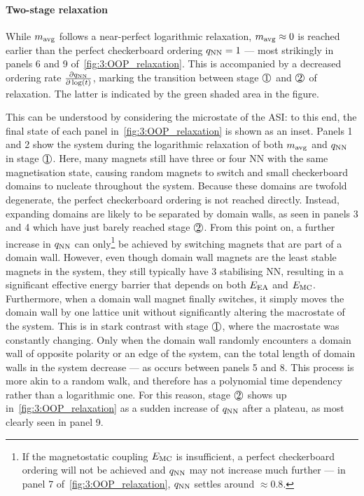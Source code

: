 \paragraph{Two-stage relaxation}
While $m_\mathrm{avg}$ follows a near-perfect logarithmic relaxation, $m_\mathrm{avg} \approx 0$ is reached earlier than the perfect checkerboard ordering $q_\mathrm{NN} = 1$ --- most strikingly in panels 6 and 9 of~\cref{fig:3:OOP_relaxation}.
This is accompanied by a decreased ordering rate $\frac{\partial q_\mathrm{NN}}{\partial \log(t)}$, marking the transition between stage $\circled{1}$ and $\circled{2}$ of relaxation.
The latter is indicated by the green shaded area in the figure. \par
This can be understood by considering the microstate of the ASI: to this end, the final state of each panel in~\cref{fig:3:OOP_relaxation} is shown as an inset.
Panels 1 and 2 show the system during the logarithmic relaxation of both $m_\mathrm{avg}$ and $q_\mathrm{NN}$ in stage $\circled{1}$.
Here, many magnets still have three or four NN with the same magnetisation state, causing random magnets to switch and small checkerboard domains to nucleate throughout the system.
Because these domains are twofold degenerate, the perfect checkerboard ordering is not reached directly.
Instead, expanding domains are likely to be separated by domain walls, as seen in panels 3 and 4 which have just barely reached stage $\circled{2}$.
From this point on, a further increase in $q_\mathrm{NN}$ can only\footnote{
	If the magnetostatic coupling $E_\mathrm{MC}$ is insufficient, a perfect checkerboard ordering will not be achieved and $q_\mathrm{NN}$ may not increase much further --- in panel 7 of~\cref{fig:3:OOP_relaxation}, $q_\mathrm{NN}$ settles around $\approx 0.8$.
} be achieved by switching magnets that are part of a domain wall.
However, even though domain wall magnets are the least stable magnets in the system, they still typically have 3 stabilising NN, resulting in a significant effective energy barrier that depends on both $E_\mathrm{EA}$ and $E_\mathrm{MC}$.
Furthermore, when a domain wall magnet finally switches, it simply moves the domain wall by one lattice unit without significantly altering the macrostate of the system.
This is in stark contrast with stage $\circled{1}$, where the macrostate was constantly changing.
Only when the domain wall randomly encounters a domain wall of opposite polarity or an edge of the system, can the total length of domain walls in the system decrease --- as occurs between panels 5 and 8.
This process is more akin to a random walk, and therefore has a polynomial time dependency rather than a logarithmic one.
For this reason, stage $\circled{2}$ shows up in~\cref{fig:3:OOP_relaxation} as a sudden increase of $q_\mathrm{NN}$ after a plateau, as most clearly seen in panel 9. \par
